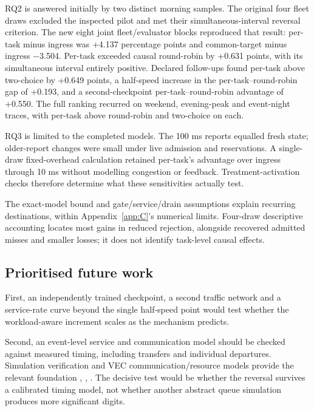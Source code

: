 \documentclass[12pt,a4paper]{article}
\begin{document}
RQ2 is answered initially by two distinct morning samples. The original four fleet draws excluded the inspected pilot and met their simultaneous-interval reversal criterion. The new eight joint fleet/evaluator blocks reproduced that result: per-task minus ingress was +4.137 percentage points and common-target minus ingress \ensuremath{-}3.504. Per-task exceeded causal round-robin by +0.631 points, with its simultaneous interval entirely positive. Declared follow-ups found per-task above two-choice by +0.649 points, a half-speed increase in the per-task--round-robin gap of +0.193, and a second-checkpoint per-task--round-robin advantage of +0.550. The full ranking recurred on weekend, evening-peak and event-night traces, with per-task above round-robin and two-choice on each.

RQ3 is limited to the completed models. The 100 ms reports equalled fresh state; older-report changes were small under live admission and reservations. A single-draw fixed-overhead calculation retained per-task's advantage over ingress through 10 ms without modelling congestion or feedback. Treatment-activation checks therefore determine what these sensitivities actually test.

The exact-model bound and gate/service/drain assumptions explain recurring destinations, within Appendix~\ref{app:C}'s numerical limits. Four-draw descriptive accounting locates most gains in reduced rejection, alongside recovered admitted misses and smaller losses; it does not identify task-level causal effects.

\FloatBarrier
\subsection{Prioritised future work}\label{sec:4.4}

First, an independently trained checkpoint, a second traffic network and a service-rate curve beyond the single half-speed point would test whether the workload-aware increment scales as the mechanism predicts.

Second, an event-level service and communication model should be checked against measured timing, including transfers and individual departures. Simulation verification and VEC communication/resource models provide the relevant foundation \cite{ref21}, \cite{ref31}, \cite{ref6}. The decisive test would be whether the reversal survives a calibrated timing model, not whether another abstract queue simulation produces more significant digits.
\end{document}
